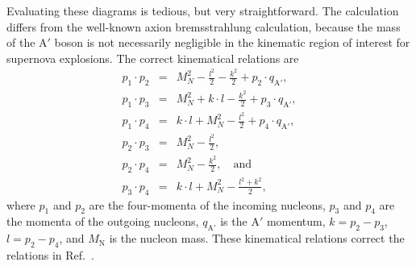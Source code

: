 \documentclass[nofootinbib,prd,superscriptaddress,twocolumn]{revtex4}
\newcommand{\bea}{\begin{eqnarray}}
\newcommand{\eea}{\end{eqnarray}}
\newcommand{\qa}{q_{\mathrm{A}'}}
\newcommand{\Aprime}{\mathrm{A}'}
\begin{document}
Evaluating these diagrams is tedious, but very straightforward. The calculation differs 
from the well-known axion bremsstrahlung calculation, because the mass of the $\Aprime$ boson is not 
necessarily negligible in the kinematic region of interest for supernova explosions.
The correct kinematical relations are 
%
\bea 
p_1 \cdot p_2 &=& M_N^2 - \frac{l^2}{2} - \frac{k^2}{2} + p_2 \cdot \qa,\\
p_1 \cdot p_3 &=& M_N^2 + k \cdot l - \frac{k^2}{2} + p_3 \cdot \qa,\\  
p_1 \cdot p_4 &=& k \cdot l + M_N^2 - \frac{l^2}{2} + p_4 \cdot \qa, \\
p_2 \cdot p_3 &=& M_N^2 - \frac{l^2}{2}, \\ 
p_2 \cdot p_4 &=& M_N^2 - \frac{k^2}{2},\quad \mathrm{and}\\
p_3 \cdot p_4 &=& k \cdot l + M_N^2 - \frac{l^2 + k^2}{2},
\eea
%
where $p_1$ and $p_2$ are the four-momenta of the incoming nucleons, $p_3$ and $p_4$ are the momenta 
of the outgoing nucleons, $\qa$ is the $\Aprime$ momentum, $k=p_2 - p_3$, $l=p_2 - p_4$, and $M_{\mathrm{N}}$ 
is the nucleon mass. These kinematical relations correct the relations in Ref.~\cite{dent_etal12}.
\end{document}
